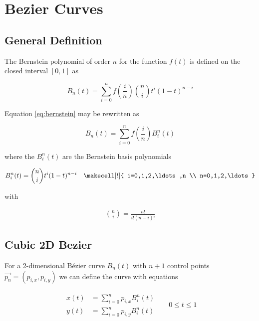 \section{Bezier Curves}
\label{sec:bezier}

\subsection{General Definition}

The Bernstein polynomial of order $n$ for the function $f(t)$ is defined on the closed interval $[0,1]$ as

\begin{equation}
    B_n(t) = \sum_{i=0}^n f\left(\frac{i}{n}\right){n\choose i} t^i\left(1-t\right)^{n-i}
    \label{eq:bernstein}
\end{equation}

Equation \ref{eq:bernstein} may be rewritten as

\begin{equation}
    B_n(t) = \sum_{i=0}^n f\left(\frac{i}{n}\right) B_i^n(t)
\end{equation}

where the $B_i^n(t)$ are the Bernstein basis polynomials

\begin{align}
    B_i^n(t) = {n\choose i} t^i (1-t)^{n-i} & & \makecell[l]{ i=0,1,2,\ldots,n \\ n=0,1,2,\ldots }
\end{align}

with

\begin{align}
    {n\choose i} = \frac{n!}{i!(n-i)!}
\end{align}

\subsection{Cubic 2D Bezier}

For a 2-dimensional B\'ezier curve $B_n(t)$ with $n+1$ control points $\vec{p_n} = (p_{i,x}, p_{i,y})$ we can define the curve with equations

\begin{align}
    \left.\begin{aligned}
        x(t) &= \sum_{i=0}^n p_{i,x} B_i^n(t) \\
        y(t) &= \sum_{i=0}^n p_{i,y} B_i^n(t)
    \end{aligned}\right.
    & & 0 \leq t \leq 1
\end{align}


